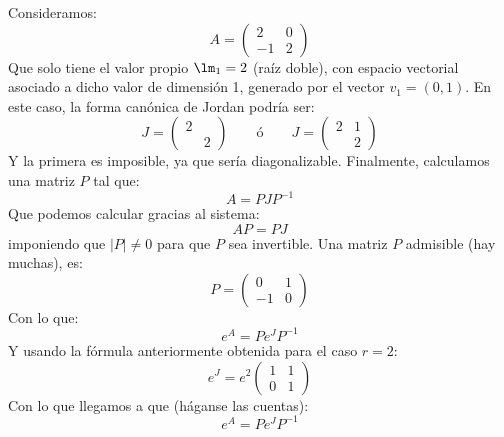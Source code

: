 \begin{ejemplo}
    Consideramos:
    \begin{equation*}
        A = \left(\begin{array}{cc}
                2 & 0 \\
                -1 & 2
        \end{array}\right)
    \end{equation*}
    Que solo tiene el valor propio $\lm_1=2$ (raíz doble), con espacio vectorial asociado a dicho valor de dimensión 1, generado por el vector $v_1=(0,1)$. En este caso, la forma canónica de Jordan podría ser:
    \begin{equation*}
        J = \left(\begin{array}{cc}
                2 & \\
                   & 2
        \end{array}\right) \qquad \text{ó} \qquad 
        J = \left(\begin{array}{cc}
                2 & 1\\
                   & 2
        \end{array}\right) 
    \end{equation*}
    Y la primera es imposible, ya que sería diagonalizable. Finalmente, calculamos una matriz $P$ tal que:
    \begin{equation*}
        A = P J P^{-1}
    \end{equation*}
    Que podemos calcular gracias al sistema:
    \begin{equation*}
        AP = PJ
    \end{equation*}
    imponiendo que $|P|\neq 0$ para que $P$ sea invertible. Una matriz $P$ admisible (hay muchas), es:
    \begin{equation*}
        P = \left(\begin{array}{cc}
                0 & 1 \\
                -1 & 0
        \end{array}\right)
    \end{equation*}
    Con lo que:
    \begin{equation*}
        e^A = Pe^J P^{-1}
    \end{equation*}
    Y usando la fórmula anteriormente obtenida para el caso $r=2$:
    \begin{equation*}
        e^J = e^2 \left(\begin{array}{cc}
                1 & 1 \\
                0 & 1
        \end{array}\right)
    \end{equation*}
    Con lo que llegamos a que (háganse las cuentas):
    \begin{equation*}
        e^A = P e^J P^{-1}
    \end{equation*}
\end{ejemplo}

